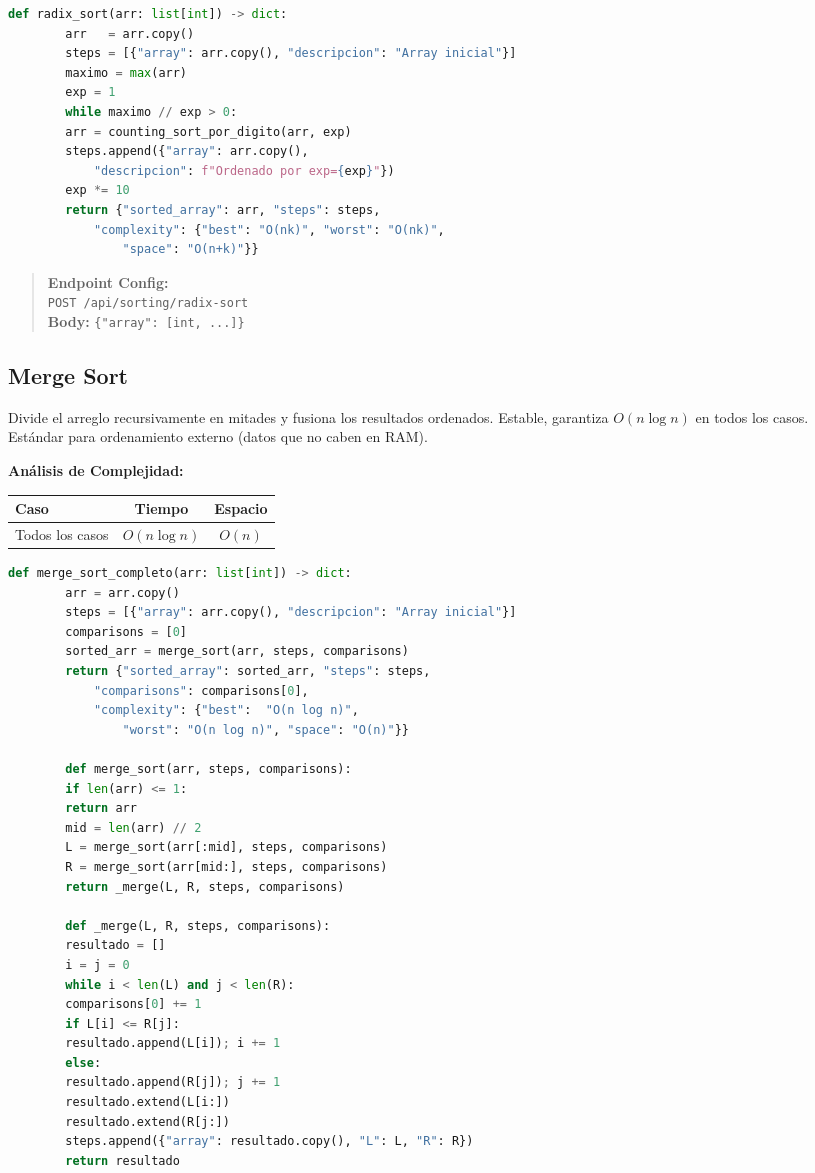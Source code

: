 \documentclass[12pt, letterpaper]{article}
\begin{document}
	\begin{lstlisting}[language=Python, caption={Implementacion de Radix Sort}]
		def radix_sort(arr: list[int]) -> dict:
		arr   = arr.copy()
		steps = [{"array": arr.copy(), "descripcion": "Array inicial"}]
		maximo = max(arr)
		exp = 1
		while maximo // exp > 0:
		arr = counting_sort_por_digito(arr, exp)
		steps.append({"array": arr.copy(),
			"descripcion": f"Ordenado por exp={exp}"})
		exp *= 10
		return {"sorted_array": arr, "steps": steps,
			"complexity": {"best": "O(nk)", "worst": "O(nk)",
				"space": "O(n+k)"}}
	\end{lstlisting}
	
	\begin{quote}
		\textbf{Endpoint Config:} \\
		\texttt{POST /api/sorting/radix-sort} \\
		\textbf{Body:} \texttt{\{"array": [int, ...]\}}
	\end{quote}
	
	\subsection{Merge Sort}
	Divide el arreglo recursivamente en mitades y fusiona los resultados ordenados. Estable, garantiza $O(n \log n)$ en todos los casos. Estándar para ordenamiento externo (datos que no caben en RAM).
	
	\textbf{Análisis de Complejidad:}
	\begin{table}[h]
		\centering
		\begin{tabular}{@{}lcc@{}}
			\toprule
			\textbf{Caso} & \textbf{Tiempo} & \textbf{Espacio} \\ \midrule
			Todos los casos & $O(n \log n)$ & $O(n)$ \\ \bottomrule
		\end{tabular}
	\end{table}
	
	\begin{lstlisting}[language=Python, caption={Implementacion de Merge Sort}]
		def merge_sort_completo(arr: list[int]) -> dict:
		arr = arr.copy()
		steps = [{"array": arr.copy(), "descripcion": "Array inicial"}]
		comparisons = [0]
		sorted_arr = merge_sort(arr, steps, comparisons)
		return {"sorted_array": sorted_arr, "steps": steps,
			"comparisons": comparisons[0],
			"complexity": {"best":  "O(n log n)",
				"worst": "O(n log n)", "space": "O(n)"}}
		
		def merge_sort(arr, steps, comparisons):
		if len(arr) <= 1:
		return arr
		mid = len(arr) // 2
		L = merge_sort(arr[:mid], steps, comparisons)
		R = merge_sort(arr[mid:], steps, comparisons)
		return _merge(L, R, steps, comparisons)
		
		def _merge(L, R, steps, comparisons):
		resultado = []
		i = j = 0
		while i < len(L) and j < len(R):
		comparisons[0] += 1
		if L[i] <= R[j]:
		resultado.append(L[i]); i += 1
		else:
		resultado.append(R[j]); j += 1
		resultado.extend(L[i:])
		resultado.extend(R[j:])
		steps.append({"array": resultado.copy(), "L": L, "R": R})
		return resultado
	\end{lstlisting}
	
\end{document}
